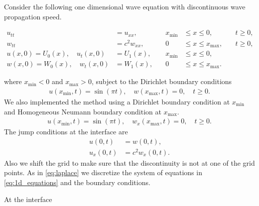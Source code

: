 \documentclass[10pt,a4paper,twoside, french]{article}
\numberwithin{equation}{section}
\numberwithin{figure}{section}
\numberwithin{table}{section}
\begin{document}
Consider the following one dimensional wave equation with discontinuous wave propagation speed. 
\begin{center}
\begin{minipage}[c]{.7\textwidth}
\begin{align}
u_{tt} &= u_{xx}, \quad &x_{\min}&\leq x\leq 0, \quad &t\geq0,\\
w_{tt} &= c^2w_{xx}, \quad &0&\leq x\leq x_{\max}, \quad &t\geq0,\\
u(x,0) = U_0(x), \quad u_t(x,0) &= U_1(x), \quad &x_{\min}&\leq x\leq 0,\\
w(x,0) = W_0(x), \quad w_t(x,0) &= W_1(x), \quad &0&\leq x\leq x_{\max}.
\label{eq:1d_equations}
\end{align}
\end{minipage}
\end{center}

where $x_{\min}<0$ and $x_{\max}>0$, subject to the Dirichlet boundary conditions
\begin{align}
u(x_{\min},t) = \sin(\pi t), \quad w(x_{\max},t) = 0, \quad t\geq 0.
\label{eq:1d_bc_1}
\end{align}
We also implemented the method using a Dirichlet boundary condition at $x_{\min}$ and Homogeneous Neumann boundary condition at $x_{\max}$. 
\begin{align}
u(x_{\min},t) = \sin(\pi t), \quad w_x(x_{\max},t) = 0, \quad t\geq 0.
\label{eq:1d_bc_2}
\end{align}
The jump conditions at the interface are
\begin{align}
u(0,t) &= w(0,t), \nonumber \\
u_x(0,t) &= c^2w_x(0,t).
\label{eq:1d_jump}
\end{align}
Also we shift the grid to make sure that the discontinuity is not at one of the grid points. As in \eqref{eq:laplace} we discretize the system of equations in \eqref{eq:1d_equations} and the  boundary conditions.

At the interface

\centering
\begin{minipage}[c]{0.5\textwidth}

\end{minipage}
\end{document}
